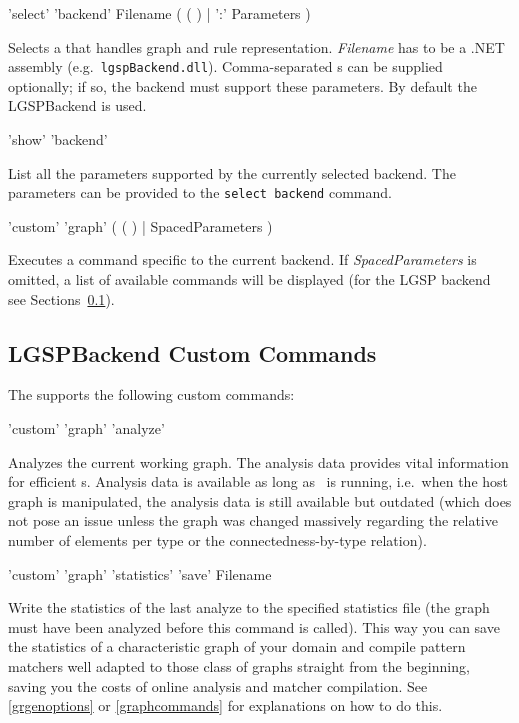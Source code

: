\begin{rail}
  'select' 'backend' Filename ( ( ) | ':' Parameters )
\end{rail}
Selects a  that handles graph and rule representation.
\emph{Filename} has to be a .NET assembly (e.g.\ \texttt{lgspBackend.dll}).
Comma-separated s can be supplied optionally; if so, the backend must support these parameters.
By default the LGSPBackend is used.

\begin{rail}
  'show' 'backend'
\end{rail}\nopagebreak{}
List all the parameters supported by the currently selected backend.
The parameters can be provided to the \texttt{select backend} command.

\begin{rail}
  'custom' 'graph' ( ( ) | SpacedParameters )
\end{rail}
Executes a command specific to the current backend.
If \emph{SpacedParameters} is omitted, a list of available commands will be displayed (for the LGSP backend see Sections~\ref{custom}).


\subsection{LGSPBackend Custom Commands}
\label{custom}


The  supports the following custom commands:

\begin{rail}
  'custom' 'graph' 'analyze'
\end{rail}
Analyzes the current working graph.
The analysis data provides vital information for efficient s.
Analysis data is available as long as \GrShell\ is running, i.e.\ when the host graph is manipulated, the analysis data is still available but outdated (which does not pose an issue unless the graph was changed massively regarding the relative number of elements per type or the connectedness-by-type relation).

\begin{rail}
  'custom' 'graph' 'statistics' 'save' Filename
\end{rail}
Write the statistics of the last analyze to the specified statistics file (the graph must have been analyzed before this command is called).
This way you can save the statistics of a characteristic graph of your domain and compile pattern matchers well adapted to those class of graphs straight from the beginning, saving you the costs of online analysis and matcher compilation.
See \ref{grgenoptions} or \ref{graphcommands} for explanations on how to do this.

